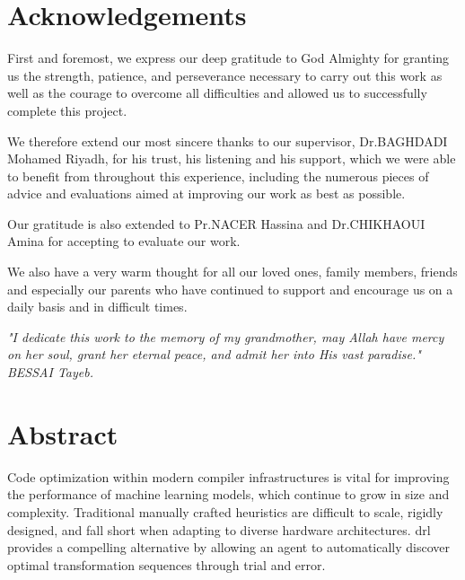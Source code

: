 \documentclass[12pt,a4paper]{report}
\begin{document}
\clearpage
{}
\pagestyle{fancy}

\chapter*{Acknowledgements}
First and foremost, we express our deep gratitude to God Almighty for granting us the strength, patience,
and perseverance necessary to carry out this work as well as the
courage to overcome all difficulties and allowed us to successfully complete this project.

We therefore extend our most sincere thanks to our supervisor, Dr.BAGHDADI Mohamed Riyadh, for his trust, his listening and his support, which we were able to benefit from throughout this experience, including the numerous pieces of advice and evaluations aimed at improving our work as best as possible.

Our gratitude is also extended to Pr.NACER Hassina and Dr.CHIKHAOUI Amina for accepting to evaluate our work.

We also have a very warm thought for all our loved ones, family members, friends and especially our parents who have continued to support and encourage us on a daily basis and in difficult times.

\textit{"I dedicate this work to the memory of my grandmother, may Allah have mercy on her soul, grant her eternal peace, and admit her into His vast paradise." BESSAI Tayeb.}

\renewcommand{\glstextformat}[1]{\textbf{\textcolor{black}{#1}}}

\chapter*{Abstract}
Code optimization within modern compiler infrastructures is vital for improving the performance of machine learning models, which continue to grow in size and complexity. Traditional manually crafted heuristics are difficult to scale, rigidly designed, and fall short when adapting to diverse hardware architectures. \gls{drl} provides a compelling alternative by allowing an agent to automatically discover optimal transformation sequences through trial and error.
\end{document}
